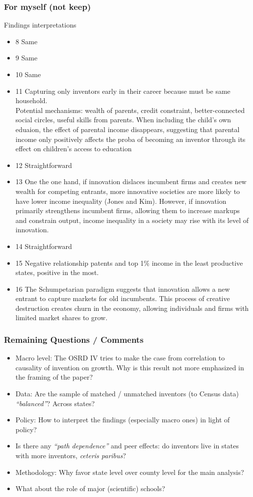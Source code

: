 \documentclass[aspectratio=169, 12pt, final]{beamer}
\begin{document}
\begin{frame}
\frametitle{For myself (not keep)}
Findings interpretations
\footnotesize
\begin{itemize}
	\item 8 Same
	\item 9 Same
	\item 10 Same
	\item 11 Capturing only inventors early in their career because must be same household. \\ Potential mechanisms: wealth of parents, credit constraint, better-connected social circles, useful skills from parents. When including the child's own eduaion, the effect of parental income disappears, suggesting that parental income only positively affects the proba of becoming an inventor through its effect on children's access to education
	\item 12 Straightforward
	\item 13 One the one hand, if innovation dislaces incumbent firms and creates new wealth for competing entrants, more innovative societies are more likely to have lower income inequality (Jones and Kim). However, if innovation primarily strengthens incumbent firms, allowing them to increase markups and constrain output, income inequality in a society may rise with its level of innovation.
	\item 14 Straightforward
	\item 15 Negative relationship patents and top 1\% income in the least productive states, positive in the most.
	\item 16 The Schumpetarian paradigm suggests that innovation allows a new entrant to capture markets for old incumbents. This process of creative destruction creates churn in the economy, allowing individuals and firms with limited market shares to grow.
\end{itemize}
\end{frame}


\begin{frame}
\frametitle{Remaining Questions / Comments}
\begin{itemize}
	\item Macro level: The OSRD IV tries to make the case from correlation to causality of invention on growth. Why is this result not more emphasized in the framing of the paper?
	\item Data: Are the sample of matched / unmatched inventors (to Census data) \textit{``balanced''}? Across states?
	\item Policy: How to interpret the findings (especially macro ones) in light of policy?
	\item Is there any \textit{``path dependence''} and peer effects: do inventors live in states with more inventors, \textit{ceteris paribus}?
	\item Methodology: Why favor state level over county level for the main analysis?
	\item What about the role of major (scientific) schools?
\end{itemize}
\end{frame}
\end{document}
